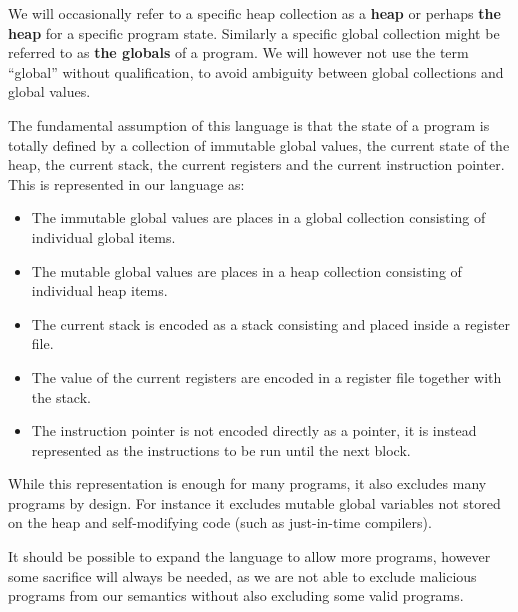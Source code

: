 We will occasionally refer to a specific heap collection as a \textbf{heap} or
perhaps \textbf{the heap} for a specific program state. Similarly a specific
global collection might be referred to as \textbf{the globals} of a program. We
will however not use the term ``global'' without qualification, to avoid
ambiguity between global collections and global values.

The fundamental assumption of this language is that the state of a program is
totally defined by a collection of immutable global values, the current state of
the heap, the current stack, the current registers and the current instruction
pointer. This is represented in our language as:

\begin{itemize}
\item The immutable global values are places in a global collection
  consisting of individual global items.
\item The mutable global values are places in a heap collection
  consisting of individual heap items.
\item The current stack is encoded as a stack consisting and placed inside a
  register file.
\item The value of the current registers are encoded in a register file together
  with the stack.
\item The instruction pointer is not encoded directly as a pointer, it is
  instead represented as the instructions to be run until the next block.
\end{itemize}

While this representation is enough for many programs, it also excludes many
programs by design. For instance it excludes mutable global variables not stored
on the heap and self-modifying code (such as just-in-time compilers).

It should be possible to expand the language to allow more programs, however
some sacrifice will always be needed, as we are not able to exclude malicious
programs from our semantics without also excluding some valid programs.
